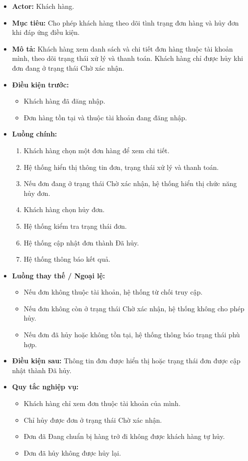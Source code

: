 \begin{itemize}
    \item \textbf{Actor:} Khách hàng.
    \item \textbf{Mục tiêu:} Cho phép khách hàng theo dõi tình trạng đơn hàng và hủy đơn khi đáp ứng điều kiện.
    \item \textbf{Mô tả:} Khách hàng xem danh sách và chi tiết đơn hàng thuộc tài khoản mình, theo dõi trạng thái xử lý và thanh toán. Khách hàng chỉ được hủy khi đơn đang ở trạng thái Chờ xác nhận.
    \item \textbf{Điều kiện trước:}
    \begin{itemize}
        \item Khách hàng đã đăng nhập.
        \item Đơn hàng tồn tại và thuộc tài khoản đang đăng nhập.
    \end{itemize}
    \item \textbf{Luồng chính:}
    \begin{enumerate}
        \item Khách hàng chọn một đơn hàng để xem chi tiết.
        \item Hệ thống hiển thị thông tin đơn, trạng thái xử lý và thanh toán.
        \item Nếu đơn đang ở trạng thái Chờ xác nhận, hệ thống hiển thị chức năng hủy đơn.
        \item Khách hàng chọn hủy đơn.
        \item Hệ thống kiểm tra trạng thái đơn.
        \item Hệ thống cập nhật đơn thành Đã hủy.
        \item Hệ thống thông báo kết quả.
    \end{enumerate}
    \item \textbf{Luồng thay thế / Ngoại lệ:}
    \begin{itemize}
        \item Nếu đơn không thuộc tài khoản, hệ thống từ chối truy cập.
        \item Nếu đơn không còn ở trạng thái Chờ xác nhận, hệ thống không cho phép hủy.
        \item Nếu đơn đã hủy hoặc không tồn tại, hệ thống thông báo trạng thái phù hợp.
    \end{itemize}
    \item \textbf{Điều kiện sau:} Thông tin đơn được hiển thị hoặc trạng thái đơn được cập nhật thành Đã hủy.
    \item \textbf{Quy tắc nghiệp vụ:}
    \begin{itemize}
        \item Khách hàng chỉ xem đơn thuộc tài khoản của mình.
        \item Chỉ hủy được đơn ở trạng thái Chờ xác nhận.
        \item Đơn đã Đang chuẩn bị hàng trở đi không được khách hàng tự hủy.
        \item Đơn đã hủy không được hủy lại.
    \end{itemize}
\end{itemize}

